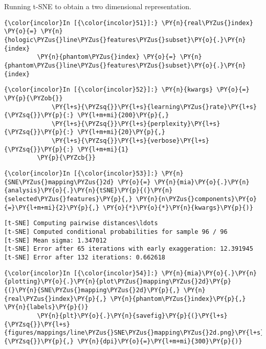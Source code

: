 Running t-SNE to obtain a two dimensional representation.

    \begin{Verbatim}[commandchars=\\\{\}]
{\color{incolor}In [{\color{incolor}51}]:} \PY{n}{real\PYZus{}index} \PY{o}{=} \PY{n}{hologic\PYZus{}line\PYZus{}features\PYZus{}subset}\PY{o}{.}\PY{n}{index}
         \PY{n}{phantom\PYZus{}index} \PY{o}{=} \PY{n}{phantom\PYZus{}line\PYZus{}features\PYZus{}subset}\PY{o}{.}\PY{n}{index}
\end{Verbatim}

    \begin{Verbatim}[commandchars=\\\{\}]
{\color{incolor}In [{\color{incolor}52}]:} \PY{n}{kwargs} \PY{o}{=} \PY{p}{\PYZob{}}
             \PY{l+s}{\PYZsq{}}\PY{l+s}{learning\PYZus{}rate}\PY{l+s}{\PYZsq{}}\PY{p}{:} \PY{l+m+mi}{200}\PY{p}{,}
             \PY{l+s}{\PYZsq{}}\PY{l+s}{perplexity}\PY{l+s}{\PYZsq{}}\PY{p}{:} \PY{l+m+mi}{20}\PY{p}{,}
             \PY{l+s}{\PYZsq{}}\PY{l+s}{verbose}\PY{l+s}{\PYZsq{}}\PY{p}{:} \PY{l+m+mi}{1}
         \PY{p}{\PYZcb{}}
\end{Verbatim}

    \begin{Verbatim}[commandchars=\\\{\}]
{\color{incolor}In [{\color{incolor}53}]:} \PY{n}{SNE\PYZus{}mapping\PYZus{}2d} \PY{o}{=} \PY{n}{mia}\PY{o}{.}\PY{n}{analysis}\PY{o}{.}\PY{n}{tSNE}\PY{p}{(}\PY{n}{selected\PYZus{}features}\PY{p}{,} \PY{n}{n\PYZus{}components}\PY{o}{=}\PY{l+m+mi}{2}\PY{p}{,} \PY{o}{*}\PY{o}{*}\PY{n}{kwargs}\PY{p}{)}
\end{Verbatim}

    \begin{Verbatim}[commandchars=\\\{\}]
[t-SNE] Computing pairwise distances\ldots
[t-SNE] Computed conditional probabilities for sample 96 / 96
[t-SNE] Mean sigma: 1.347012
[t-SNE] Error after 65 iterations with early exaggeration: 12.391945
[t-SNE] Error after 132 iterations: 0.662618
    \end{Verbatim}

    \begin{Verbatim}[commandchars=\\\{\}]
{\color{incolor}In [{\color{incolor}54}]:} \PY{n}{mia}\PY{o}{.}\PY{n}{plotting}\PY{o}{.}\PY{n}{plot\PYZus{}mapping\PYZus{}2d}\PY{p}{(}\PY{n}{SNE\PYZus{}mapping\PYZus{}2d}\PY{p}{,} \PY{n}{real\PYZus{}index}\PY{p}{,} \PY{n}{phantom\PYZus{}index}\PY{p}{,} \PY{n}{labels}\PY{p}{)}
         \PY{n}{plt}\PY{o}{.}\PY{n}{savefig}\PY{p}{(}\PY{l+s}{\PYZsq{}}\PY{l+s}{figures/mappings/line\PYZus{}SNE\PYZus{}mapping\PYZus{}2d.png}\PY{l+s}{\PYZsq{}}\PY{p}{,} \PY{n}{dpi}\PY{o}{=}\PY{l+m+mi}{300}\PY{p}{)}
\end{Verbatim}

